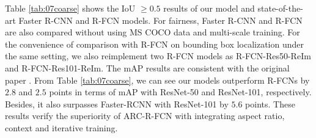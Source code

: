 \documentclass[10pt,twocolumn,letterpaper]{article}
\begin{document}
\begin{table} 
\begin{center}
\end{center}
\caption{mAP results with IoU $\ge 0.5$ of Faster-RCNN, R-FCN and ARC-R-CNN on PASCAL VOC 2007 test set. ResNet-50 and ResNet-101 are used as the backbone architectures. Time is evaluated on a Nvidia K40 GPU.}
\label{tab:07coarse} 
\vspace{-3mm}
\end{table}

Table \ref{tab:07coarse} shows the IoU $\ge 0.5$ results of our model and state-of-the-art Faster R-CNN \cite{faster_rcnn} and R-FCN \cite{rfcn} models. For fairness, Faster R-CNN and R-FCN are also compared without using MS COCO data and multi-scale training.
For the convenience of comparison with R-FCN on bounding box localization under the same setting, we also reimplement two R-FCN models as R-FCN-Res50-ReIm and R-FCN-Res101-ReIm. The mAP results are consistent with the original paper \cite{rfcn}.
From Table \ref{tab:07coarse}, we can see our models outperform R-FCNs by $2.8$ and $2.5$ points in terms of mAP with ResNet-50 and ResNet-101, respectively. Besides, it also surpasses Faster-RCNN with ResNet-101 by $5.6$ points. These results verify the superiority of ARC-R-FCN with integrating aspect ratio, context and iterative training.
\end{document}

